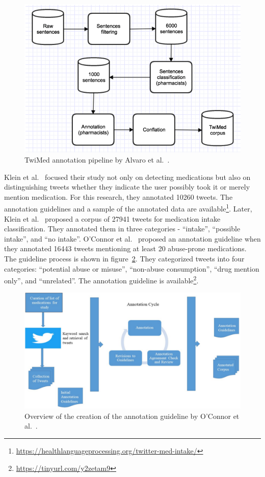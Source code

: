 \begin{figure}[h]
	\centering
	\includegraphics[width=0.99\linewidth]{Figures/b.png}
	\caption{TwiMed annotation pipeline by Alvaro et al.~\cite{alvaro2017twimed}.}
	\label{fig:architecture-twimed-alvaro}
\end{figure}

Klein et al.~\cite{klein2017detecting} focused their study not only on detecting medications but also on distinguishing tweets whether they indicate the user possibly took it or merely mention medication. For this research, they annotated 10260 tweets. The annotation guidelines and a sample of the annotated data are available\footnote{\url{https://healthlanguageprocessing.org/twitter-med-intake/}}. Later, Klein et al.~\cite{klein2019analysis} proposed a corpus of 27941 tweets for medication intake classification. They annotated them in three categories - “intake”, “possible intake”, and “no intake”. O’Connor et al.~\cite{o2020promoting} proposed an annotation guideline when they annotated 16443 tweets mentioning at least 20 abuse-prone medications. The guideline process is shown in figure~\ref{fig:annotation-oconnor}. They categorized tweets into four categories: “potential abuse or misuse”, “non-abuse consumption”, “drug mention only”, and “unrelated”. The annotation guideline is available\footnote{\url{https://tinyurl.com/y2zetam9}}.

\begin{figure}[h]
	\centering
	\includegraphics[width=0.99\linewidth]{Figures/d.png}
	\caption{Overview of the creation of the annotation guideline by O’Connor et al.~\cite{o2020promoting}.}
	\label{fig:annotation-oconnor}
\end{figure}

